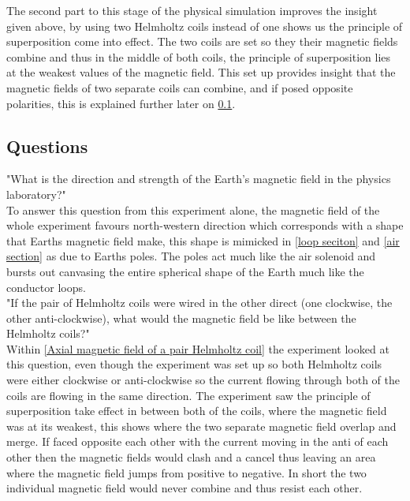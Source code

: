 \documentclass[12pt]{article}
\begin{document}
The second part to this stage of the physical simulation improves the insight given above, by using two Helmholtz coils instead of one shows us the principle of superposition come into effect. The two coils are set so they their magnetic fields combine and thus in the middle of both coils, the principle of superposition lies at the weakest values of the magnetic field. This set up provides insight that the magnetic fields of two separate coils can combine, and if posed opposite polarities, this is explained further later on \cref{questions}.

\subsection{Questions}
\label{questions}

"What is the direction and strength of the Earth's magnetic field in the physics laboratory?" \cite{Exp.5-2019}\\

To answer this question from this experiment alone, the magnetic field of the whole experiment favours north-western direction which corresponds with a shape that Earths magnetic field make, this shape is mimicked in \cref{loop seciton} and \cref{air section} as due to Earths poles. The poles act much like the air solenoid and bursts out canvasing the entire spherical shape of the Earth much like the conductor loops.  \\

"If the pair of Helmholtz coils were wired in the other direct (one clockwise, the other anti-clockwise), what would the magnetic field be like between the Helmholtz coils?"\cite{Exp.5-2019}\\

Within \cref{Axial magnetic field of a pair Helmholtz coil} the experiment looked at this question, even though the experiment was set up so both Helmholtz coils were either clockwise or anti-clockwise so the current flowing through both of the coils are flowing in the same direction. The experiment saw the principle of superposition take effect in between both of the coils, where the magnetic field was at its weakest, this shows where the two separate magnetic field overlap and merge. If faced opposite each other with the current moving in the anti of each other then the magnetic fields would clash and a cancel thus leaving an area where the magnetic field jumps from positive to negative. In short the two individual magnetic field would never combine and thus resist each other. 
\end{document}
